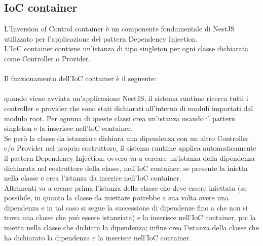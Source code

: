 \subsection{IoC container}
L'Inversion of Control container è un componente fondamentale di NestJS utilizzato per l'applicazione
del pattern Dependency Injection.
\\
L'IoC container contiene un'istanza di tipo singleton per ogni classe dichiarata come Controller o Provider.
\\\\
Il funzionamento dell'IoC container è il seguente:
\\\\
quando viene avviata un'applicazione NestJS, il sistema runtime ricerca tutti i controller e provider che 
sono stati dichiarati all'interno di moduli importati dal modulo root. Per ognuna di queste classi crea un'istanza
usando il pattern singleton e la inserisce nell'IoC container. 
\\
Se però la classe da istanziare dichiara una dipendenza con un altro Controller e/o Provider nel proprio 
costruttore, il sistema runtime applica automaticamente il pattern Dependency Injection; ovvero
va a cercare un'istanza della dipendenza dichiarata nel costruttore della classe, nell'IoC container; se
presente la inietta nella classe e crea l'istanza da inserire nell'IoC container. 
\\
Altrimenti va a creare prima
l'istanza della classe che deve essere iniettata (se possibile, in quanto la
classe da iniettare potrebbe a sua volta avere una dipendenza e in tal caso si segue la successione di 
dipendenze fino a che non si trova una classe che può essere istanziata) e la inserisce nell'IoC container, 
poi la inietta nella classe che dichiara
la dipendenza; infine crea l'istanza della classe che ha dichiarato la dipendenza e la inserisce nell'IoC container.

